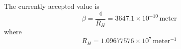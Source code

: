 \documentclass[12pt]{article}
\begin{document}
%
%
%
%
%

\noindent
The currently accepted value is
\begin{equation*}
\beta=\frac{4}{R_H}=3647.1\times10^{-10}\,\text{meter}
\end{equation*}
where
\begin{equation*}
R_H=1.09677576\times10^7\,\text{meter}^{-1}
\end{equation*}
\end{document}
